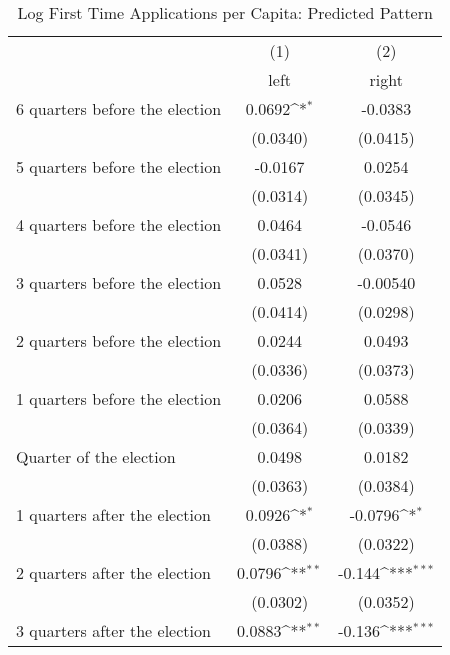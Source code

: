 \begin{table}[htbp]\centering
\def\sym#1{\ifmmode^{#1}\else\(^{#1}\)\fi}
\caption{Log First Time Applications per Capita: Predicted Pattern}
\begin{tabular}{l*{2}{c}}
\hline\hline
                    &\multicolumn{1}{c}{(1)}&\multicolumn{1}{c}{(2)}\\
                    &\multicolumn{1}{c}{left}&\multicolumn{1}{c}{right}\\
\hline
 6 quarters before the election&      0.0692\sym{*}  &     -0.0383         \\
                    &    (0.0340)         &    (0.0415)         \\
[1em]
 5 quarters before the election&     -0.0167         &      0.0254         \\
                    &    (0.0314)         &    (0.0345)         \\
[1em]
 4 quarters before the election&      0.0464         &     -0.0546         \\
                    &    (0.0341)         &    (0.0370)         \\
[1em]
 3 quarters before the election&      0.0528         &    -0.00540         \\
                    &    (0.0414)         &    (0.0298)         \\
[1em]
 2 quarters before the election&      0.0244         &      0.0493         \\
                    &    (0.0336)         &    (0.0373)         \\
[1em]
 1 quarters before the election&      0.0206         &      0.0588         \\
                    &    (0.0364)         &    (0.0339)         \\
[1em]
Quarter of the election&      0.0498         &      0.0182         \\
                    &    (0.0363)         &    (0.0384)         \\
[1em]
 1 quarters after the election&      0.0926\sym{*}  &     -0.0796\sym{*}  \\
                    &    (0.0388)         &    (0.0322)         \\
[1em]
 2 quarters after the election&      0.0796\sym{**} &      -0.144\sym{***}\\
                    &    (0.0302)         &    (0.0352)         \\
[1em]
 3 quarters after the election&      0.0883\sym{**} &      -0.136\sym{***}\\

\end{tabular}
\end{table}

